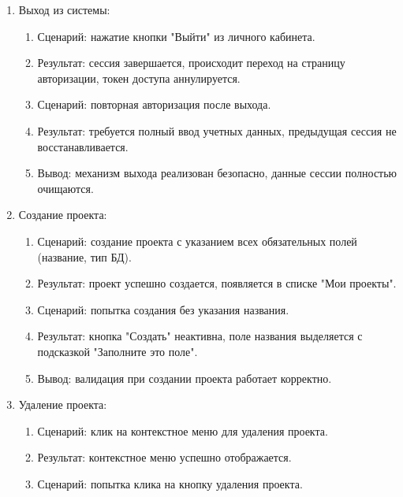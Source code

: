 \begin{enumerate}
\item Выход из системы:
    \begin{enumerate}
     \item Сценарий: нажатие кнопки "Выйти" из личного кабинета.
     
     \item Результат: сессия завершается, происходит переход на страницу авторизации, токен доступа аннулируется.
     
     \item Сценарий: повторная авторизация после выхода.

     \item Результат: требуется полный ввод учетных данных, предыдущая сессия не восстанавливается.

     \item Вывод: механизм выхода реализован безопасно, данные сессии полностью очищаются.

    \end{enumerate}


\item Создание проекта:
    \begin{enumerate}
     \item Сценарий: создание проекта с указанием всех обязательных полей (название, тип БД).
     
     \item Результат: проект успешно создается, появляется в списке "Мои проекты".
     
     \item Сценарий: попытка создания без указания названия.

     \item Результат: кнопка "Создать" неактивна, поле названия выделяется с подсказкой "Заполните это поле".

     \item Вывод: валидация при создании проекта работает корректно.

    \end{enumerate}
    
\item Удаление  проекта:
    \begin{enumerate}
     \item Сценарий: клик на контекстное меню для удаления проекта.
     
     \item Результат: контекстное меню успешно отображается.
     
     \item Сценарий: попытка клика на кнопку удаления проекта.


\end{enumerate}
\end{enumerate}

